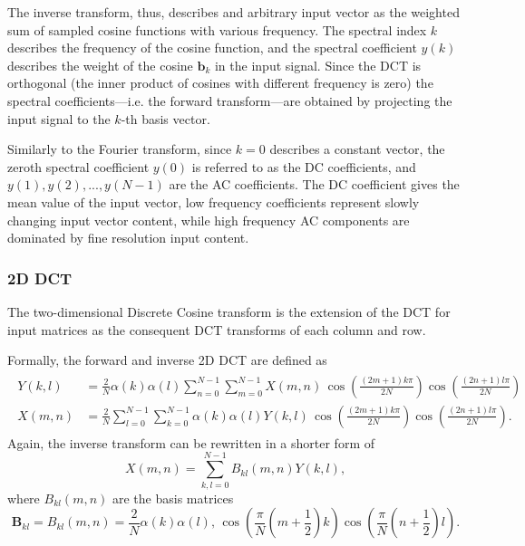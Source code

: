 The inverse transform, thus, describes and arbitrary input vector as the weighted sum of sampled cosine functions with various frequency.
The spectral index $k$ describes the frequency of the cosine function, and the spectral coefficient $y(k)$ describes the weight of the cosine $\mathbf{b}_k$ in the input signal.
Since the DCT is orthogonal (the inner product of cosines with different frequency is zero) the spectral coefficients---i.e. the forward transform---are obtained by projecting the input signal to the $k$-th basis vector.


Similarly to the Fourier transform, since $k=0$ describes a constant vector, the zeroth spectral coefficient $y(0)$ is referred to as the DC coefficients, and $y(1),y(2),...,y(N-1)$ are the AC coefficients.
The DC coefficient gives the mean value of the input vector, low frequency coefficients represent slowly changing input vector content, while high frequency AC components are dominated by fine resolution input content.

\subsubsection*{2D DCT}
The two-dimensional Discrete Cosine transform is the extension of the DCT for input matrices as the consequent DCT transforms of each column and row.

Formally, the forward and inverse 2D DCT are defined as 
\begin{align*}
\begin{split}
Y(k,l) &= \frac{2}{N} \alpha(k) \alpha(l) \sum_{n = 0}^{N-1} \sum_{m = 0}^{N-1}
X(m,n) \, \cos\left( \frac{(2m +1) k\pi}{2N}\right)
\cos\left( \frac{(2n +1) l\pi}{2N}\right) \\
X(m,n) &= \frac{2}{N}  \sum_{l = 0}^{N-1} \sum_{k = 0}^{N-1} \alpha(k) \alpha(l)
Y(k,l) \, \cos\left( \frac{(2m +1) k\pi}{2N}\right)
\cos\left( \frac{(2n +1) l\pi}{2N}\right).
\end{split}
\end{align*}
Again, the inverse transform can be rewritten in a shorter form of
\begin{equation}
X(m,n) = \sum_{k,l = 0}^{N-1} B_{kl}(m,n) Y(k,l),
\end{equation}
where $B_{kl}(m,n)$ are the basis matrices
\begin{equation}
\mathbf{B}_{kl} =  B_{kl}(m,n) = \frac{2}{N} \alpha(k)\alpha(l),  \, \cos\left( \frac{\pi}{N} \left( m + \frac{1}{2}\right) k \right)
\cos\left( \frac{\pi}{N} \left( n + \frac{1}{2}\right) l \right).
\end{equation}


